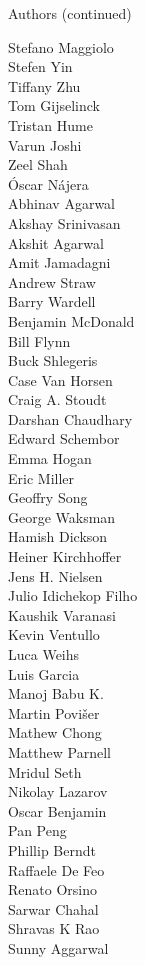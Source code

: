 \begin{frame}{Authors (continued)}
\begin{multicols}{5}
Stefano Maggiolo\\
Stefen Yin\\
Tiffany Zhu\\
Tom Gijselinck\\
Tristan Hume\\
Varun Joshi\\
Zeel Shah\\
Óscar Nájera\\
Abhinav Agarwal\\
Akshay Srinivasan\\
Akshit Agarwal\\
Amit Jamadagni\\
Andrew Straw\\
Barry Wardell\\
Benjamin McDonald\\
Bill Flynn\\
Buck Shlegeris\\
Case Van Horsen\\
Craig A. Stoudt\\
Darshan Chaudhary\\
Edward Schembor\\
Emma Hogan\\
Eric Miller\\
Geoffry Song\\
George Waksman\\
Hamish Dickson\\
Heiner Kirchhoffer\\
Jens H. Nielsen\\
Julio Idichekop Filho\\
Kaushik Varanasi\\
Kevin Ventullo\\
Luca Weihs\\
Luis Garcia\\
Manoj Babu K.\\
Martin Povišer\\
Mathew Chong\\
Matthew Parnell\\
Mridul Seth\\
Nikolay Lazarov\\
Oscar Benjamin\\
Pan Peng\\
Phillip Berndt\\
Raffaele De Feo\\
Renato Orsino\\
Sarwar Chahal\\
Shravas K Rao\\
Sunny Aggarwal\\

\end{multicols}
\end{frame}
